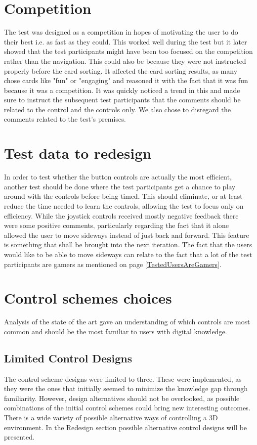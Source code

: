 \section*{Competition}
The test was designed as a competition in hopes of motivating the user to do their best i.e. as fast as they could. This worked well during the test but it later showed that the test participants might have been too focused on the competition rather than the navigation. This could also be because they were not instructed properly before the card sorting. It affected the card sorting results, as many chose cards like "fun" or "engaging" and reasoned it with the fact that it was fun because it was a competition. It was quickly noticed a trend in this and made sure to instruct the subsequent test participants that the comments should be related to the control and the controls only. 
We also chose to disregard the comments related to the test's premises.

\section*{Test data to redesign}
In order to test whether the button controls are actually the most efficient, another test should be done where the test participants get a chance to play around with the controls before being timed. This should eliminate, or at least reduce the time needed to learn the controls, allowing the test to focus only on efficiency.
While the joystick controls received mostly negative feedback there were some positive comments, 
particularly regarding the fact that it alone allowed the user to move sideways instead of just back 
and forward. This feature is something that shall be brought into the next iteration. The fact that the users would like to be able to move sideways can relate to the fact that a lot of the test participants are gamers as mentioned on page \ref{TestedUsersAreGamers}. 

\section*{Control schemes choices}
Analysis of the state of the art gave an understanding of which controls are most common and should be the most familiar to users with digital knowledge.

\subsection*{Limited Control Designs} 
The control scheme designs were limited to three. These were implemented, as they were the ones that initially seemed to minimize the knowledge gap through familiarity. However, design alternatives should not be overlooked, as possible combinations of the initial control schemes could bring new interesting outcomes. There is a wide variety of possible alternative ways of controlling a 3D environment. In the Redesign section possible alternative control designs will be presented.


